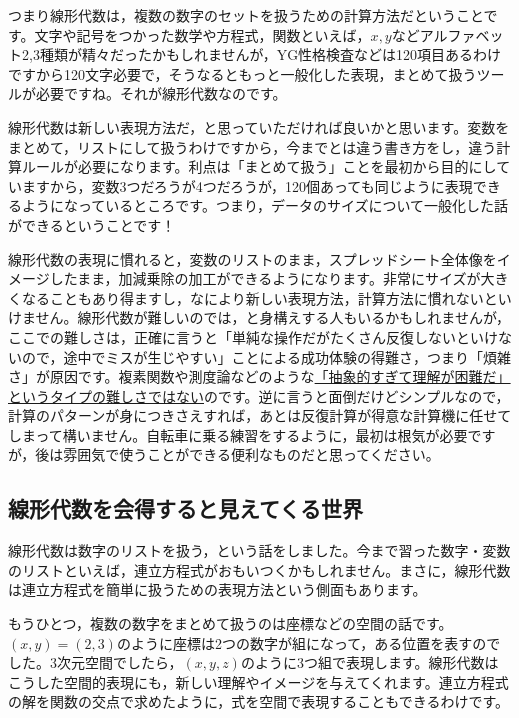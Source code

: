 \documentclass{ltjsbook}
\begin{document}
つまり線形代数は，複数の数字のセットを扱うための計算方法だということです。文字や記号をつかった数学や方程式，関数といえば，$x,y$などアルファベット2,3種類が精々だったかもしれませんが，YG性格検査などは120項目あるわけですから120文字必要で，そうなるともっと一般化した表現，まとめて扱うツールが必要ですね。それが線形代数なのです。

線形代数は新しい表現方法だ，と思っていただければ良いかと思います。変数をまとめて，リストにして扱うわけですから，今までとは違う書き方をし，違う計算ルールが必要になります。利点は「まとめて扱う」ことを最初から目的にしていますから，変数3つだろうが4つだろうが，120個あっても同じように表現できるようになっているところです。つまり，データのサイズについて一般化した話ができるということです！

線形代数の表現に慣れると，変数のリストのまま，スプレッドシート全体像をイメージしたまま，加減乗除の加工ができるようになります。非常にサイズが大きくなることもあり得ますし，なにより新しい表現方法，計算方法に慣れないといけません。線形代数が難しいのでは，と身構えする人もいるかもしれませんが，ここでの難しさは，正確に言うと「単純な操作だがたくさん反復しないといけないので，途中でミスが生じやすい」ことによる成功体験の得難さ，つまり「煩雑さ」が原因です。複素関数や測度論などのような\underline{「抽象的すぎて理解が困難だ」というタイプの難しさではない}のです。逆に言うと面倒だけどシンプルなので，計算のパターンが身につきさえすれば，あとは反復計算が得意な計算機に任せてしまって構いません。自転車に乗る練習をするように，最初は根気が必要ですが，後は雰囲気で使うことができる便利なものだと思ってください。
\subsection{線形代数を会得すると見えてくる世界}
線形代数は数字のリストを扱う，という話をしました。今まで習った数字・変数のリストといえば，連立方程式がおもいつくかもしれません。まさに，線形代数は連立方程式を簡単に扱うための表現方法という側面もあります。

もうひとつ，複数の数字をまとめて扱うのは座標などの空間の話です。$(x,y)=(2,3)$のように座標は2つの数字が組になって，ある位置を表すのでした。3次元空間でしたら，$(x,y,z)$のように3つ組で表現します。線形代数はこうした空間的表現にも，新しい理解やイメージを与えてくれます。連立方程式の解を関数の交点で求めたように，式を空間で表現することもできるわけです。
\end{document}
